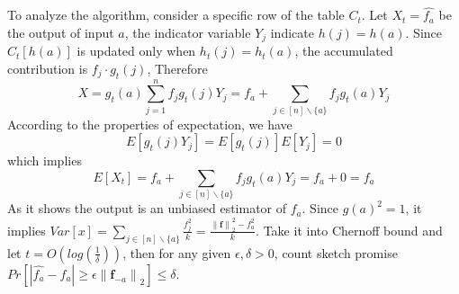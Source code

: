 \documentclass[CJK, a4paper]{cctart}
\begin{document}
To analyze the algorithm, consider a specific row of the table $C_t$. Let $X_t = \hat{f_a} $ be the output of input $a$, the indicator variable $Y_j$ indicate $h(j) = h(a) $. Since $C_t[h(a)] $ is updated only when $h_t(j) = h_t(a) $, the accumulated contribution is $f_j \cdot g_t(j) $, Therefore
$$X = g_t(a)\sum_{j = 1}^{n}f_jg_t(j)Y_j = f_a + \sum_{j \in [n] \backslash \{a\} }f_jg_t(a)Y_j$$
According to the properties of expectation, we have 
$$E[g_t(j)Y_j] = E[g_t(j)]E[Y_j] = 0 $$
which implies
$$E[X_t] = f_a + \sum_{j \in [n] \backslash \{a\} }f_jg_t(a)Y_j = f_a + 0 = f_a $$
As it shows the output is an unbiased estimator of $f_a$. Since $g(a)^2 = 1$, it implies $Var[x] = \sum_{j \in [n] \backslash \{a\}}\frac{f_j^2}{k} = \frac{{\parallel \mathbf{f} \parallel}_2^2 - f_a^2}{k} $. Take it into Chernoff bound and let $t = O(log(\frac{1}{\delta})) $, then for any given $\epsilon, \delta > 0$, count sketch promise $Pr[|\hat{f_a} - f_a| \ge {\epsilon \parallel \mathbf{f}_{-a} \parallel}_2] \le \delta  $.
\end{document}

